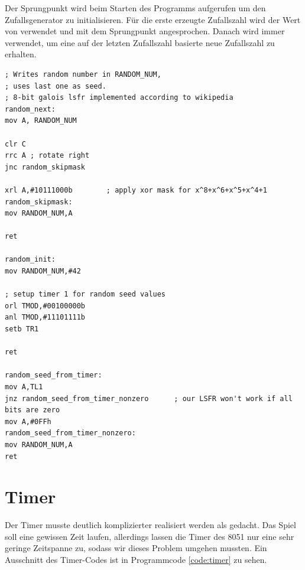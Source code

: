 Der Sprungpunkt  wird beim Starten des Programms aufgerufen um den Zufallsgenerator zu initialisieren. Für die erste erzeugte Zufallszahl wird der Wert von  verwendet und mit dem Sprungpunkt  angesprochen. Danach wird immer  verwendet, um eine auf der letzten Zufallszahl basierte neue Zufallszahl zu erhalten.

\noindent
\begin{minipage}[t]{\textwidth}
	\vspace{1em}
	\begin{lstlisting}[caption=Quellcode für die Zufallszahlen-Generierung, label=code:random]
; Writes random number in RANDOM_NUM,
; uses last one as seed.
; 8-bit galois lsfr implemented according to wikipedia
random_next:
mov A, RANDOM_NUM

clr C
rrc A ; rotate right
jnc random_skipmask

xrl A,#10111000b		; apply xor mask for x^8+x^6+x^5+x^4+1
random_skipmask:
mov RANDOM_NUM,A

ret

random_init:
mov RANDOM_NUM,#42

; setup timer 1 for random seed values
orl TMOD,#00100000b
anl TMOD,#11101111b
setb TR1

ret

random_seed_from_timer:
mov A,TL1
jnz random_seed_from_timer_nonzero		; our LSFR won't work if all bits are zero
mov A,#0FFh
random_seed_from_timer_nonzero:
mov RANDOM_NUM,A
ret
	\end{lstlisting}
\end{minipage}

\section{Timer}

Der Timer musste deutlich komplizierter realisiert werden als gedacht. Das Spiel soll eine gewissen Zeit laufen, allerdings lassen die Timer des 8051 nur eine sehr geringe Zeitspanne zu, sodass wir dieses Problem umgehen mussten. Ein Ausschnitt des Timer-Codes ist in Programmcode \ref{code:timer} zu sehen. 

